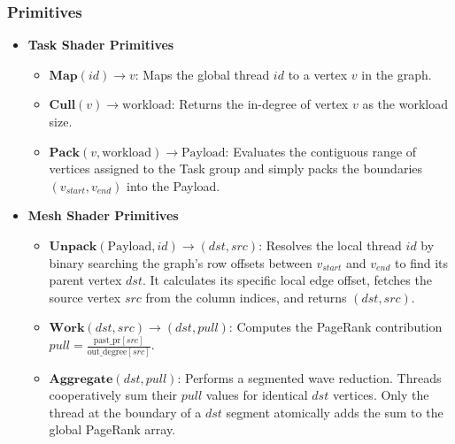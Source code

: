 \documentclass[11pt, a4paper]{article}
\begin{document}
\subsubsection{Primitives}

\begin{itemize}
    \item \textbf{Task Shader Primitives}
    \begin{itemize}
        \item $\textbf{Map}(id) \rightarrow v$: Maps the global thread $id$ to a vertex $v$ in the graph.
        \item $\textbf{Cull}(v) \rightarrow \text{workload}$: Returns the in-degree of vertex $v$ as the workload size.
        \item $\textbf{Pack}(v, \text{workload}) \rightarrow \text{Payload}$: Evaluates the contiguous range of vertices assigned to the Task group and simply packs the boundaries $(v_{start}, v_{end})$ into the Payload.
    \end{itemize}
    \item \textbf{Mesh Shader Primitives}
    \begin{itemize}
        \item $\textbf{Unpack}(\text{Payload}, id) \rightarrow (dst, src)$: Resolves the local thread $id$ by binary searching the graph's row offsets between $v_{start}$ and $v_{end}$ to find its parent vertex $dst$. It calculates its specific local edge offset, fetches the source vertex $src$ from the column indices, and returns $(dst, src)$.
        \item $\textbf{Work}(dst, src) \rightarrow (dst, pull)$: Computes the PageRank contribution $pull = \frac{\text{past\_pr}[src]}{\text{out\_degree}[src]}$.
        \item $\textbf{Aggregate}(dst, pull)$: Performs a segmented wave reduction. Threads cooperatively sum their $pull$ values for identical $dst$ vertices. Only the thread at the boundary of a $dst$ segment atomically adds the sum to the global PageRank array.
    \end{itemize}
\end{itemize}
\end{document}
